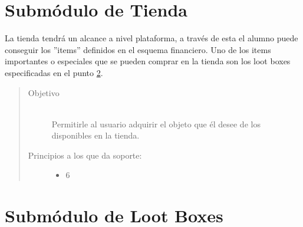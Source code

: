 \section{Submódulo de Tienda}

    La tienda tendrá un alcance a nivel plataforma, a través de esta el alumno puede conseguir los ''items'' definidos en el esquema financiero. Uno de los items importantes o especiales que se pueden comprar en la tienda son los loot boxes especificadas en el punto \ref{herr:lootBoxes}.

    \begin{quote}
    \begin{description}
    \item[Objetivo] \hfill\\
        Permitirle al usuario adquirir el objeto que él desee de los disponibles en la tienda.

    \item[Principios a los que da soporte:] \hfill
        \begin{itemize}
            \item 6 \principioVI
        \end{itemize}
    \end{description}
    \end{quote}

\section{Submódulo de Loot Boxes}
\label{herr:lootBoxes}

\begin{comment}
    Cada Loot Box desbloquea 4 objetos de la siguiente lista para el usuario:
    \begin{itemize}
        \item Apodo - Objeto de personalización
        \item Tema (Color) - Objeto de personalización
        \item Tema (Patron) - Objeto de personalización
        \item Imagen de perfil - Objeto de personalización
        \item Loot Box
        \item Cierta cantidad de monedas de oro y/o plata
    \end{itemize}
\end{comment}

